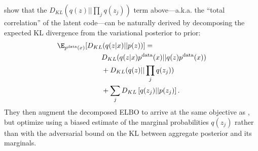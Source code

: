 \citet{chen2018isolating} show that the $D_{KL}(q(z)||\prod_{j} q(z_j))$ term above---a.k.a. the ``total correlation'' of the latent code---can be naturally derived by decomposing the expected KL divergence from the variational posterior to prior:
\begin{align} \nonumber%
    \E_{p^{\text{data}}(x)}[&D_{KL}(q(z|x)||p(z))] = \\
    &\quad\quad D_{KL}(q(z|x)p^{\text{data}}(x)||q(z)p^{\text{data}}(x)) \nonumber \\
        &\quad\quad+ D_{KL}(q(z)||\prod_j q(z_j))
     \nonumber\\
    &\quad\quad + \sum_j D_{KL} \left[ q(z_j) || p(z_j) \right]. \nonumber
\end{align}
They then augment the decomposed ELBO to arrive at the same objective as \citet{kim2018disentangling}, but optimize using a biased estimate of the marginal probabilities $q(z_j)$ rather than with the adversarial bound on the KL between aggregate posterior and its marginals.
